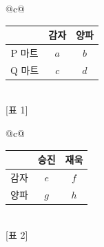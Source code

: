 \begin{tabular}{@{}c@{}}
\\[1pt]
\begin{tabular}{|c|c|c|}
\hline
 & 감자 & 양파 \\
\hline
P 마트 & $a$ & $b$ \\
\hline
Q 마트 & $c$ & $d$ \\
\hline
\end{tabular}\\[2pt]
{[표 1]}
\end{tabular}\hspace{1.2em}
\begin{tabular}{@{}c@{}}
\\[1pt]
\begin{tabular}{|c|c|c|}
\hline
 & 승진 & 재욱 \\
\hline
감자 & $e$ & $f$ \\
\hline
양파 & $g$ & $h$ \\
\hline
\end{tabular}\\[2pt]
{[표 2]}
\end{tabular}
